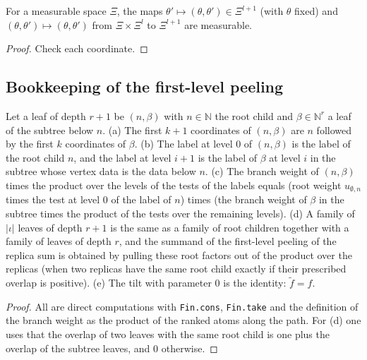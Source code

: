 \begin{lemma}\label{lem:sg:cons-measurable}
  \leanok
For a measurable space $\Xi$, the maps $\theta'\mapsto(\theta,\theta')\in\Xi^{l+1}$ (with $\theta$ fixed) and $(\theta,\theta')\mapsto(\theta,\theta')$ from
$\Xi\times\Xi^l$ to $\Xi^{l+1}$ are measurable.
\end{lemma}
\begin{proof}
  \leanok
Check each coordinate.
\end{proof}

\subsection*{Bookkeeping of the first-level peeling}

\begin{lemma}\label{lem:sg:peeling-bookkeeping}
  \leanok
Let a leaf of depth $r+1$ be $(n,\beta)$ with $n\in\mathbb N$ the root child and $\beta\in\mathbb N^r$ a leaf of the subtree below $n$.
(a) The first $k+1$ coordinates of $(n,\beta)$ are $n$ followed by the first $k$ coordinates of $\beta$.
(b) The label at level $0$ of $(n,\beta)$ is the label of the root child $n$, and the label at level $i+1$ is the label of $\beta$ at level $i$ in the subtree
whose vertex data is the data below $n$.
(c) The branch weight of $(n,\beta)$ times the product over the levels of the tests of the labels equals (root weight $u_{\emptyset,n}$ times the test at level $0$ of the label of $n$)
times (the branch weight of $\beta$ in the subtree times the product of the tests over the remaining levels).
(d) A family of $|\iota|$ leaves of depth $r+1$ is the same as a family of root children together with a family of leaves of depth $r$, and the summand of the first-level
peeling of the replica sum is obtained by pulling these root factors out of the product over the replicas (when two replicas have the same root child exactly
if their prescribed overlap is positive).
(e) The tilt with parameter $0$ is the identity: $\tilde f=f$.
\end{lemma}
\begin{proof}
  \leanok
All are direct computations with \texttt{Fin.cons}, \texttt{Fin.take} and the definition of the branch weight as the product of the ranked atoms along the path.
For (d) one uses that the overlap of two leaves with the same root child is one plus the overlap of the subtree leaves, and $0$ otherwise.
\end{proof}

